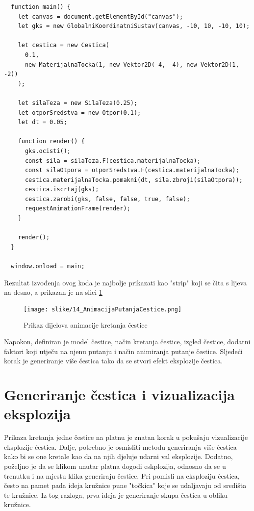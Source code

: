 \documentclass{foi}
\begin{document}
\begin{verbatim}
  function main() {
    let canvas = document.getElementById("canvas");
    let gks = new GlobalniKoordinatniSustav(canvas, -10, 10, -10, 10);

    let cestica = new Cestica(
      0.1,
      new MaterijalnaTocka(1, new Vektor2D(-4, -4), new Vektor2D(1, -2))
    );

    let silaTeza = new SilaTeza(0.25);
    let otporSredstva = new Otpor(0.1);
    let dt = 0.05;

    function render() {
      gks.ocisti();
      const sila = silaTeza.F(cestica.materijalnaTocka);
      const silaOtpora = otporSredstva.F(cestica.materijalnaTocka);
      cestica.materijalnaTocka.pomakni(dt, sila.zbroji(silaOtpora));
      cestica.iscrtaj(gks);
      cestica.zarobi(gks, false, false, true, false);
      requestAnimationFrame(render);
    }

    render();
  }

  window.onload = main;
\end{verbatim}
Rezultat izvođenja ovog koda je najbolje prikazati kao "strip" koji se čita s lijeva na desno, a prikazan je na slici \ref{fig:AnimacijaPutanjaCestice}

\begin{figure}[H]
    \centering
    \texttt{[image: slike/14\_AnimacijaPutanjaCestice.png]}
    \captionsetup{justification=centering}
    \caption{Prikaz dijelova animacije kretanja čestice}
\label{fig:AnimacijaPutanjaCestice}
\end{figure}

Napokon, definiran je model čestice, način kretanja čestice, izgled čestice, dodatni faktori koji utječu na njenu putanju i način animiranja putanje čestice. Sljedeći korak je generiranje više čestica tako da se stvori efekt eksplozije čestica. 

\section{Generiranje čestica i vizualizacija eksplozija}
Prikaza kretanja jedne čestice na platnu je znatan korak u pokušaju vizualizacije eksplozije čestica. Dalje, potrebno je osmisliti metodu generiranja više čestica kako bi se one kretale kao da na njih djeluje udarni val eksplozije. Dodatno, poželjno je da se klikom unutar platna dogodi eskplozija, odnosno da se u trenutku i na mjestu klika generiraju čestice. Pri pomisli na eksploziju čestica, često na pamet pada ideja kružnice pune "točkica" koje se udaljavaju od središta te kružnice. Iz tog razloga, prva ideja je generiranje skupa čestica u obliku kružnice.
\end{document}
